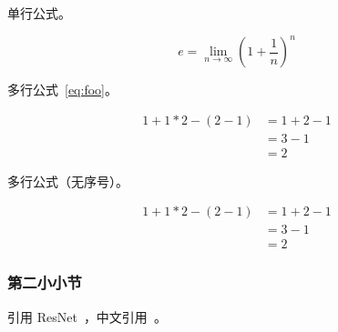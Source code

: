 单行公式。

\begin{equation}
    e = \lim_{n\to \infty} \left(1 + \frac{1}{n}\right)^n
\end{equation}

多行公式~\ref{eq:foo}。

\begin{equation}
    \begin{aligned}
        1+ 1*2 - (2-1) & = 1+ 2 - 1 \\
                       & = 3-1      \\
                       & = 2
    \end{aligned}
    \label{eq:foo}
\end{equation}

多行公式（无序号）。

\begin{equation*}
    \begin{aligned}
        1+ 1*2 - (2-1) & = 1+ 2 - 1 \\
                       & = 3-1      \\
                       & = 2
    \end{aligned}
\end{equation*}

\subsubsection{第二小小节}

引用 ResNet~\cite{he2016deep}，中文引用~\cite{libaiThesis,chenjinbiao1980jixian}。


